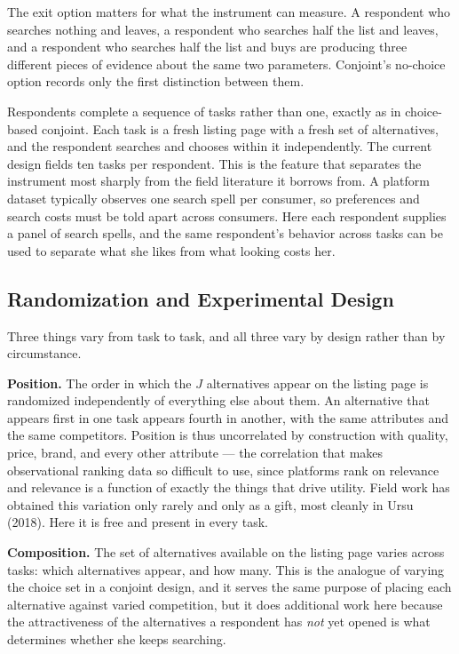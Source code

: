 \documentclass[
  letterpaper,
  DIV=11,
  numbers=noendperiod]{scrartcl}
\begin{document}
The exit option matters for what the instrument can measure. A
respondent who searches nothing and leaves, a respondent who searches
half the list and leaves, and a respondent who searches half the list
and buys are producing three different pieces of evidence about the same
two parameters. Conjoint's no-choice option records only the first
distinction between them.

Respondents complete a sequence of tasks rather than one, exactly as in
choice-based conjoint. Each task is a fresh listing page with a fresh
set of alternatives, and the respondent searches and chooses within it
independently. The current design fields ten tasks per respondent. This
is the feature that separates the instrument most sharply from the field
literature it borrows from. A platform dataset typically observes one
search spell per consumer, so preferences and search costs must be told
apart across consumers. Here each respondent supplies a panel of search
spells, and the same respondent's behavior across tasks can be used to
separate what she likes from what looking costs her.

\subsection{Randomization and Experimental
Design}\label{sec-instrument-randomization}

Three things vary from task to task, and all three vary by design rather
than by circumstance.

\textbf{Position.} The order in which the \(J\) alternatives appear on
the listing page is randomized independently of everything else about
them. An alternative that appears first in one task appears fourth in
another, with the same attributes and the same competitors. Position is
thus uncorrelated by construction with quality, price, brand, and every
other attribute --- the correlation that makes observational ranking
data so difficult to use, since platforms rank on relevance and
relevance is a function of exactly the things that drive utility. Field
work has obtained this variation only rarely and only as a gift, most
cleanly in Ursu (2018). Here it is free and present in every task.

\textbf{Composition.} The set of alternatives available on the listing
page varies across tasks: which alternatives appear, and how many. This
is the analogue of varying the choice set in a conjoint design, and it
serves the same purpose of placing each alternative against varied
competition, but it does additional work here because the attractiveness
of the alternatives a respondent has \emph{not} yet opened is what
determines whether she keeps searching.
\end{document}
